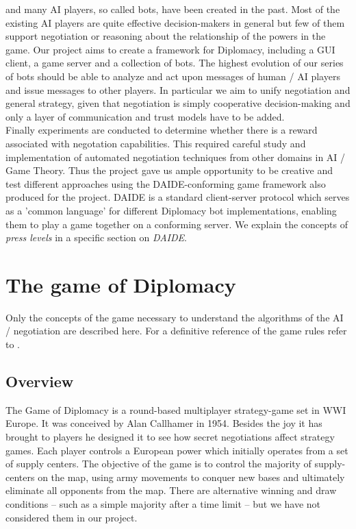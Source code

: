 \documentclass[pdftex,12pt,a4paper]{report}
\begin{document}
 and many AI
players, so called bots, have been created in the past. Most of the
existing AI players are quite effective decision-makers in general but
few of them support negotiation or reasoning about the relationship of
the powers in the game. Our project aims to create a framework for
Diplomacy, including a GUI client, a game server and a collection of
bots. The highest evolution of our series of bots should be able to
analyze and act upon messages of human / AI players and issue messages
to other players. In particular we aim to unify negotiation and
general strategy, given that negotiation is simply 
cooperative decision-making and only a layer of communication and
trust models have to be added. \\

Finally experiments are conducted to determine whether there is a
reward associated with negotation capabilities. This required careful
study and implementation of automated negotiation techniques from
other domains in AI / Game Theory. Thus the project gave us ample
opportunity to be creative and test different approaches using the
DAIDE-conforming game framework also produced for the project. DAIDE
is a standard client-server protocol \cite{DaideWeb} which serves as a
'common language' for different Diplomacy bot implementations,
enabling them to play a game together on a conforming server. We
explain the concepts of \textit{press levels} in a specific section on
\textit{DAIDE}.


\pagebreak

\chapter{The game of Diplomacy}

Only the concepts of the game necessary to understand the 
algorithms of the AI / negotiation are described here. For a
definitive reference of the game rules refer to \cite{DiploRules00}.

\section{Overview}

The Game of Diplomacy is a round-based multiplayer strategy-game set
in WWI Europe. It was conceived by Alan Callhamer in 1954. Besides
the joy it has brought to players he designed it to see how 
secret negotiations affect strategy games. Each player controls a 
European power which initially operates from a set of supply centers.
The objective of the game is to control the majority of supply-centers
on the map, using army movements to conquer new bases and ultimately
eliminate all opponents from the map. There are alternative winning
and draw conditions -- such as a simple majority after a time limit -- 
but we have not considered them in our project.
\end{document}
